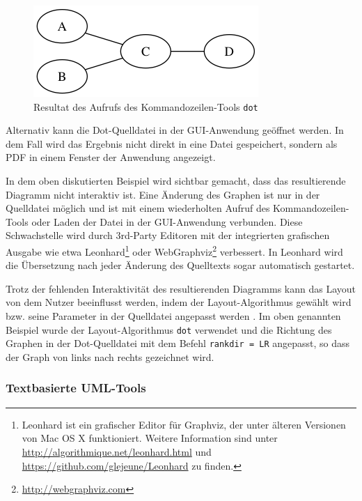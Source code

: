

\begin{figure}[hbt]
    \centering
    \includegraphics[scale=0.75]{resources/graphviz-dot-example.png}
    \caption{Resultat des Aufrufs des Kommandozeilen-Tools \lstinline{dot}}
    \label{fig:graphviz-dot-example}
\end{figure}

Alternativ kann die Dot-Quelldatei in der GUI-Anwendung geöffnet werden. In dem Fall wird das Ergebnis nicht direkt in eine Datei gespeichert, sondern als PDF in einem Fenster der Anwendung angezeigt.

In dem oben diskutierten Beispiel wird sichtbar gemacht, dass das resultierende Diagramm nicht interaktiv ist. Eine Änderung des Graphen ist nur in der Quelldatei möglich und ist mit einem wiederholten Aufruf des Kommandozeilen-Tools oder Laden der Datei in der GUI-Anwendung verbunden. Diese Schwachstelle wird durch 3rd-Party Editoren mit der integrierten grafischen Ausgabe wie etwa Leonhard\footnote{Leonhard ist ein grafischer Editor für Graphviz, der unter älteren Versionen von Mac OS X funktioniert. Weitere Information sind unter \url{http://algorithmique.net/leonhard.html} und \url{https://github.com/glejeune/Leonhard} zu finden.} oder WebGraphviz\footnote{\url{http://webgraphviz.com}} verbessert. In Leonhard wird die Übersetzung nach jeder Änderung des Quelltexts sogar automatisch gestartet.

Trotz der fehlenden Interaktivität des resultierenden Diagramms kann das Layout von dem Nutzer beeinflusst werden, indem der Layout-Algorithmus gewählt wird bzw. seine Parameter in der Quelldatei angepasst werden \cite{NorthGansner14Dot-Manual}. Im oben genannten Beispiel wurde der Layout-Algorithmus \lstinline{dot} verwendet und die Richtung des Graphen in der Dot-Quelldatei mit dem Befehl \lstinline{rankdir = LR} angepasst, so dass der Graph von links nach rechts gezeichnet wird.

\subsubsection{Textbasierte UML-Tools}

